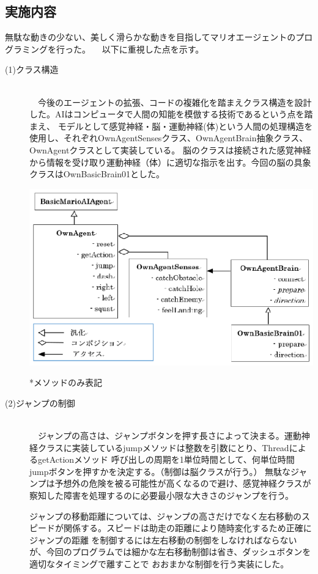 \documentclass[a4j]{jarticle}
\begin{document}
\subsection{実施内容}
無駄な動きの少ない、美しく滑らかな動きを目指してマリオエージェントのプログラミングを行った。
　以下に重視した点を示す。
 \begin{description}
 
  \item[(1)クラス構造]~\\
　今後のエージェントの拡張、コードの複雑化を踏まえクラス構造を設計した。AIはコンピュータで人間の知能を模倣する技術であるという点を踏まえ、
  	モデルとして感覚神経・脳・運動神経(体)という人間の処理構造を使用し、それぞれOwnAgentSensesクラス、OwnAgentBrain抽象クラス、OwnAgentクラスとして実装している。
  	脳のクラスは接続された感覚神経から情報を受け取り運動神経（体）に適切な指示を出す。今回の脳の具象クラスはOwnBasicBrain01とした。
  	\begin{center}
		\includegraphics[scale=2.00]{uml01.eps}
	\end{center}
	*メソッドのみ表記
  \item[(2)ジャンプの制御] ~\\
　ジャンプの高さは、ジャンプボタンを押す長さによって決まる。運動神経クラスに実装しているjumpメソッドは整数を引数にとり、ThreadによるgetActionメソッド
	呼び出しの周期を1単位時間として、何単位時間jumpボタンを押すかを決定する。（制御は脳クラスが行う。）
	無駄なジャンプは予想外の危険を被る可能性が高くなるので避け、感覚神経クラスが察知した障害を処理するのに必要最小限な大きさのジャンプを行う。
	
	ジャンプの移動距離については、ジャンプの高さだけでなく左右移動のスピードが関係する。スピードは助走の距離により随時変化するため正確にジャンプの距離
	を制御するには左右移動の制御をしなければならないが、今回のプログラムでは細かな左右移動制御は省き、ダッシュボタンを適切なタイミングで離すことで
	おおまかな制御を行う実装にした。
	

\end{description}
\end{document}
